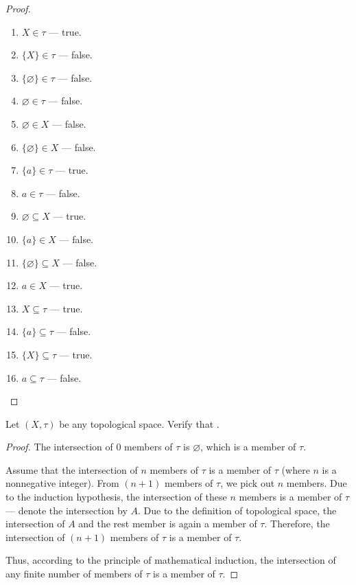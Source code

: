 \begin{proof}
    \begin{enumerate}[label={(\alph*)}]
        \item $X\in \tau$ --- true.
        \item $\{ X \}\in \tau$ --- false.
        \item $\{\varnothing\}\in \tau$ --- false.
        \item $\varnothing\in \tau$ --- false.
        \item $\varnothing\in X$ --- false.
        \item $\{\varnothing\}\in X$ --- false.
        \item $\{ a \}\in \tau$ --- true.
        \item $a\in \tau$ --- false.
        \item $\varnothing\subseteq X$ --- true.
        \item $\{ a \}\in X$ --- false.
        \item $\{ \varnothing \}\subseteq X$ --- false.
        \item $a\in X$ --- true.
        \item $X\subseteq \tau$ --- true.
        \item $\{ a \}\subseteq \tau$ --- false.
        \item $\{ X \}\subseteq \tau$ --- true.
        \item $a\subseteq \tau$ --- false.
    \end{enumerate}
\end{proof}
\newpage

\begin{exercise}
    Let $(X, \tau)$ be any topological space. Verify that \color{blue}{the intersection of any finite number of members of $\tau$ is a member of $\tau$}.
\end{exercise}

\begin{proof}
    The intersection of $0$ members of $\tau$ is $\varnothing$, which is a member of $\tau$.

    Assume that the intersection of $n$ members of $\tau$ is a member of $\tau$ (where $n$ is a nonnegative integer). From $(n+1)$ members of $\tau$, we pick out $n$ members. Due to the induction hypothesis, the intersection of these $n$ members is a member of $\tau$ --- denote the intersection by $A$. Due to the definition of topological space, the intersection of $A$ and the rest member is again a member of $\tau$. Therefore, the intersection of $(n+1)$ members of $\tau$ is a member of $\tau$.

    Thus, according to the principle of mathematical induction, the intersection of any finite number of members of $\tau$ is a member of $\tau$.
\end{proof}
\newpage

